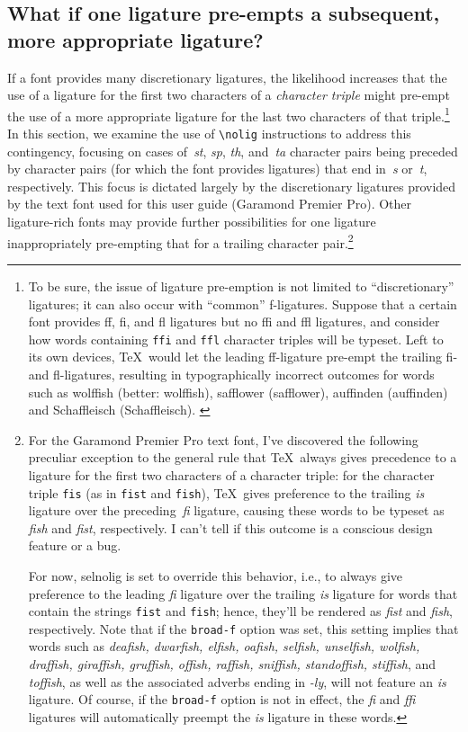 \documentclass[12pt]{article}
\newcommand{\pkg}[1]{\textsf{#1}}
\newcommand{\opt}[1]{\texttt{#1}}
\newcommand{\cmmd}[1]{\texttt{\textbackslash #1}}
\begin{document}
\subsection{What if one ligature pre-empts a subsequent, more appropriate ligature?} \label{sec:preempt}

If a font provides many discretionary ligatures, the likelihood increases that the use of a ligature for the first two characters of a \emph{character triple} might pre-empt the use of a more appropriate ligature for the last two characters of that triple.\footnote{To be sure, the issue of ligature pre-emption is not limited to \enquote{discretionary} ligatures; it can also occur with \enquote{common} f-ligatures. Suppose that a certain font provides ff, fi, and fl ligatures but no ffi and ffl ligatures, and consider how words containing \opt{ffi} and \opt{ffl} character triples will be typeset. Left to its own devices, \TeX\ would let the leading ff-ligature pre-empt the trailing fi- and fl-ligatures, resulting in typographically incorrect outcomes for words such as wol\mbox{ff}ish (better: wolf\mbox{fi}sh), sa\mbox{ff}lower (safflower), au\mbox{ff}inden (auffinden) and Scha\mbox{ff}leisch (Schaffleisch). \label{fn:triple}} 
In this section, we examine the use of \cmmd{nolig} instructions to address this contingency, focusing on cases of~\emph{st}, \emph{sp}, \emph{th}, and~\emph{ta} character pairs being preceded by character pairs (for which the font provides ligatures) that end in~\emph{s} or~\emph{t}, respectively. This focus is dictated largely by the discretionary ligatures provided by the text font used for this user guide (Garamond Premier Pro). Other ligature-rich fonts may provide further possibilities for one ligature inappropriately pre-empting that for a trailing character pair.\footnote{For the Garamond Premier Pro text font, I've discovered the following preculiar  exception to the general rule that \TeX\ always gives precedence to a ligature for the first two characters of a character triple: for the character triple \opt{fis} (as in \opt{fist} and \opt{fish}), \TeX\ gives preference to the trailing \emph{is} ligature over the preceding  \,\emph{fi} ligature, causing these words to be typeset as \emph{f\mbox{is}h} and \emph{f\mbox{is}t}, respectively. I can't tell if this outcome is a conscious design feature or a bug.

For now, \pkg{selnolig} is set to override this behavior, i.e., to always give preference to the leading \emph{fi} ligature over the trailing \emph{is} ligature for words that contain the strings \opt{fist} and \opt{fish}; hence, they'll be rendered as \emph{fist} and \emph{fish}, respectively. Note that if the \opt{broad-f} option was set, this setting implies that words such as {\em deafish, dwarfish, elfish, oafish, selfish, unselfish, wolfish, draffish, giraffish, gruffish, offish, raffish, sniffish, standoffish, stiffish}, and \emph{toffish}, as well as the associated adverbs ending in \emph{-ly}, will not feature an \emph{is} ligature. Of course, if the \opt{broad-f} option is not in effect, the \emph{fi} and \emph{ffi} ligatures will automatically preempt the \emph{is} ligature in these words.}
\end{document}
